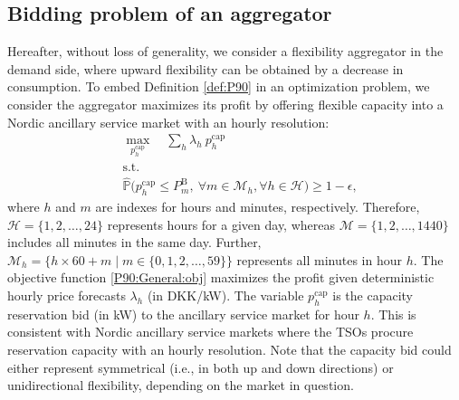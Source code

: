 \documentclass[conference]{IEEEtran}
\begin{document}
\subsection{Bidding problem of an aggregator}
\vspace{-1mm}
Hereafter, without loss of generality, we consider a flexibility aggregator in the demand side, where upward flexibility can be obtained by a decrease in consumption. To embed Definition \ref{def:P90} in an optimization problem, we consider the aggregator maximizes its profit by offering flexible capacity into a Nordic ancillary service market with an hourly resolution:
%
\begin{subequations}\label{P90:General}
    \begin{align}
    & \max_{p_{h}^{\text{cap}}} \quad  \sum_h \lambda_h \ p_{h}^{\text{cap}} \label{P90:General:obj}                                                                                                                                               \\
    &\text{s.t.} \nonumber  \\
    & \hat{\mathbb{P}}  \Big( p_{h}^{\text{cap}} \leq P_{m}^{\text{B}}, \ \forall{m} \in \mathcal{M}_{h},  \forall{h} \in \mathcal{H}  \Big) \geq 1 - \epsilon, \label{P90:General:jcc}
\end{align}    
\end{subequations}
where $h$ and $m$ are indexes for hours and minutes, respectively. Therefore, $\mathcal{H}\!=\!\{1, 2,  \ldots, 24\}$ represents hours for a given day, whereas $\mathcal{M}\!=\!\{1, 2,  \ldots, 1440\}$ includes all minutes in the same day. Further, $ \mathcal{M}_{h}\!=\!\{h \times 60 + m \mid m \in \{0, 1, 2, \ldots, 59\}\}$ represents all minutes in hour $h$. The objective function 
\eqref{P90:General:obj} maximizes the profit given deterministic hourly price forecasts $\lambda_h$ (in DKK/kW). The variable $p_{h}^{\text{cap}}$ is the capacity reservation bid (in kW) to the ancillary service market for hour $h$. This is consistent with Nordic ancillary service markets where the TSOs procure reservation capacity with an hourly resolution. Note that the capacity bid could either represent symmetrical (i.e., in both up and down directions) or unidirectional flexibility, depending on the market in question. %
\end{document}
